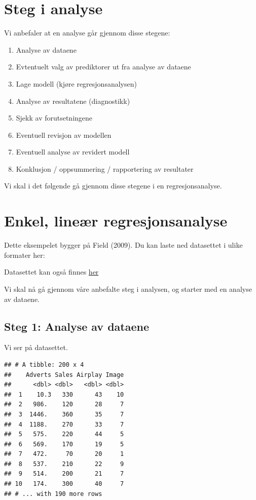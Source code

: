 \documentclass[
]{article}
\begin{document}
\hypertarget{steg-i-analyse}{%
\section{Steg i analyse}\label{steg-i-analyse}}

Vi anbefaler at en analyse går gjennom disse stegene:

\begin{enumerate}
\def\labelenumi{\arabic{enumi}.}
\item
  Analyse av dataene
\item
  Evtentuelt valg av prediktorer ut fra analyse av dataene
\item
  Lage modell (kjøre regresjonsanalysen)
\item
  Analyse av resultatene (diagnostikk)
\item
  Sjekk av forutsetningene
\item
  Eventuell revisjon av modellen
\item
  Eventuell analyse av revidert modell
\item
  Konklusjon / oppsummering / rapportering av resultater
\end{enumerate}

Vi skal i det følgende gå gjennom disse stegene i en regresjonsanalyse.

\hypertarget{enkel-lineuxe6r-regresjonsanalyse}{%
\section{Enkel, lineær
regresjonsanalyse}\label{enkel-lineuxe6r-regresjonsanalyse}}

Dette eksempelet bygger på Field (2009). Du kan laste ned datasettet i
ulike formater her:

Datasettet kan også finnes
\href{https://edge.sagepub.com/field5e/student-resources/datasets}{her}

Vi skal nå gå gjennom våre anbefalte steg i analysen, og starter med en
analyse av dataene.

\hypertarget{steg-1-analyse-av-dataene}{%
\subsection{Steg 1: Analyse av
dataene}\label{steg-1-analyse-av-dataene}}

Vi ser på datasettet.

\begin{verbatim}
## # A tibble: 200 x 4
##    Adverts Sales Airplay Image
##      <dbl> <dbl>   <dbl> <dbl>
##  1    10.3   330      43    10
##  2   986.    120      28     7
##  3  1446.    360      35     7
##  4  1188.    270      33     7
##  5   575.    220      44     5
##  6   569.    170      19     5
##  7   472.     70      20     1
##  8   537.    210      22     9
##  9   514.    200      21     7
## 10   174.    300      40     7
## # ... with 190 more rows
\end{verbatim}
\end{document}
